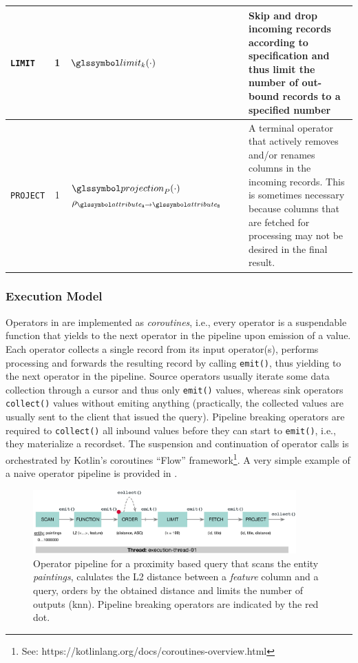 \begin{table}
\begin{tabular}{| l || c | p{30mm}  | c | p{70mm} |}
        \hline
        \texttt{LIMIT} & 1 & $\limit_k(\cdot)$ & &  Skip and drop incoming records according to specification and thus limit the number of out-bound records to a specified number \\ 
        \hline
        \texttt{PROJECT} & 1 & $\projection_{P}(\cdot)$ \newline $\rho_{\attribute_\mathtt{A} \rightarrow \attribute_\mathtt{B}}$ & & A terminal operator that actively removes and/or renames columns in the incoming records. This is sometimes necessary because columns that are fetched for processing may not be desired in the final result. \\ 
        \hline
        \hline
    \end{tabular}  
\end{table}

\subsubsection{Execution Model}

Operators in \cottontail{} are implemented as \emph{coroutines}, i.e., every operator is a suspendable function that yields to the next operator in the pipeline upon emission of a value. Each operator collects a single record from its input operator(s), performs processing and forwards the resulting record by calling \texttt{emit()}, thus yielding to the next operator in the pipeline. Source operators usually iterate some data collection through a cursor and thus only \texttt{emit()} values, whereas sink operators \texttt{collect()} values without emiting anything (practically, the collected values are usually sent to the client that issued the query). Pipeline breaking operators are required to \texttt{collect()} all inbound values before they can start to \texttt{emit()}, i.e., they materialize a recordset. The suspension and continuation of operator calls is orchestrated by Kotlin's coroutines ``Flow'' framework\footnote{See: https://kotlinlang.org/docs/coroutines-overview.html}. A very simple example of a naive operator pipeline is provided in . 

\begin{figure}[bt]
    \centering
    \includegraphics[width=0.9\textwidth]{figures/execution-model-simple}
    \caption{Operator pipeline for a proximity based query that scans the entity \emph{paintings}, calulates the L2 distance between a \emph{feature} column and a query, orders by the obtained distance and limits the number of outputs (\acrshort{knn}). Pipeline breaking operators are indicated by the red dot.}
    \label{figure:cottontail_execution_model_simple}
\end{figure}

